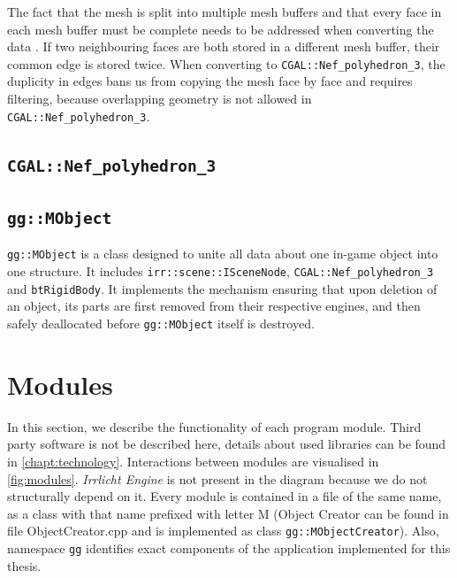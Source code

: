 The fact that the mesh is split into multiple mesh buffers and that every face in each mesh buffer must be complete needs to be addressed when converting the data . If two neighbouring faces are both stored in a different mesh buffer, their common edge is  stored twice. When converting to {\tt CGAL::Nef\_polyhedron\_3}, the duplicity in edges bans us from copying the mesh face by face and requires filtering, because overlapping geometry is not allowed in {\tt CGAL::Nef\_polyhedron\_3}. 

\subsection*{\tt CGAL::Nef\_polyhedron\_3}

\subsection*{\tt gg::MObject} 
{\tt gg::MObject} is a class designed to unite all data about one in-game object into one structure. It includes {\tt irr::scene::ISceneNode}, {\tt CGAL::Nef\_polyhedron\_3} and {\tt btRigidBody}. It implements the mechanism ensuring that upon deletion of an object, its parts are first removed from their respective engines, and then safely deallocated before {\tt gg::MObject} itself is destroyed.



\section{Modules}
In this section, we describe the functionality of each program module. Third party software is not be described here, details about used libraries can be found in \cref{chapt:technology}. Interactions between modules are visualised in \cref{fig:modules}. \emph{Irrlicht Engine} is not present in the diagram because we do not structurally depend on it. Every module is contained in a file of the same name, as a class with that name prefixed with letter M (\ie Object Creator can be found in file ObjectCreator.cpp and is implemented as class {\tt gg::MObjectCreator}). Also, namespace {\tt gg} identifies exact components of the application implemented for this thesis.

